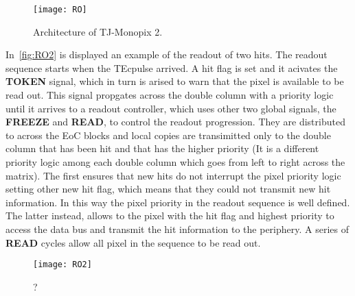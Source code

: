 \begin{figure}[h!]
\centering
\texttt{[image: RO]}
\caption{Architecture of TJ-Monopix 2.}
\label{fig:RO}
\end{figure}

In~\autoref{fig:RO2} is displayed an example of the readout of two hits. The readout sequence starts when the TEcpulse arrived. A hit flag is set and it acivates the \textsc{\textbf{TOKEN}} signal, which in turn is arised to warn that the pixel is available to be read out. This signal propgates across the double column with a priority logic until it arrives to a readout controller, which uses other two global signals, the \textsc{\textbf{FREEZE}} and \textsc{\textbf{READ}}, to control the readout progression. They are distributed to across the EoC blocks and local copies are transimitted only to the double column that has been hit and that has the higher priority (It is a different priority logic among each double column which goes from left to right across the matrix).
The first ensures that new hits do not interrupt the pixel priority logic setting other new hit flag, which means that they could not transmit new hit information. In this way the pixel priority in the readout sequence is well defined. The latter instead, allows to the pixel with the hit flag and highest priority to access the data bus and transmit the hit information to the periphery. A series of \textsc{\textbf{READ}} cycles allow all pixel in the sequence to be read out.

\begin{figure}[h!]
\centering
\texttt{[image: RO2]}
\caption{?}
\label{fig:RO2}
\end{figure}






























































